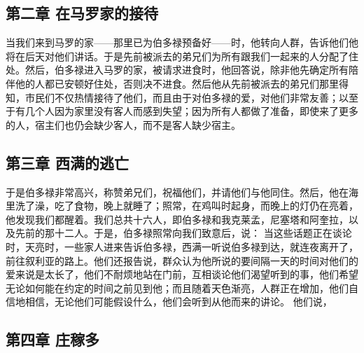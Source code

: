 
\subsection{第二章 在马罗家的接待}

当我们来到马罗的家——那里已为伯多禄预备好——时，他转向人群，告诉他们他将在后天对他们讲话。于是先前被派去的弟兄们为所有跟我们一起来的人分配了住处。然后，伯多禄进入马罗的家，被请求进食时，他回答说，除非他先确定所有陪伴他的人都已安顿好住处，否则决不进食。然后他从先前被派去的弟兄们那里得知，市民们不仅热情接待了他们，而且由于对伯多禄的爱，对他们非常友善；以至于有几个人因为家里没有客人而感到失望；因为所有人都做了准备，即使来了更多的人，宿主们也仍会缺少客人，而不是客人缺少宿主。\par


\subsection{第三章 西满的逃亡}

于是伯多禄非常高兴，称赞弟兄们，祝福他们，并请他们与他同住。然后，他在海里洗了澡，吃了食物，晚上就睡了；照常，在鸡叫时起身，而晚上的灯仍在亮着，他发现我们都醒着。我们总共十六人，即伯多禄和我克莱孟，尼塞塔和阿奎拉，以及先前的那十二人。于是，伯多禄照常向我们致意后，说： 当这些话题正在谈论时，天亮时，一些家人进来告诉伯多禄，西满一听说伯多禄到达，就连夜离开了，前往叙利亚的路上。他们还报告说，群众认为他所说的要间隔一天的时间对他们的爱来说是太长了，他们不耐烦地站在门前，互相谈论他们渴望听到的事，他们希望无论如何能在约定的时间之前见到他；而且随着天色渐亮，人群正在增加，他们自信地相信，无论他们可能假设什么，他们会听到从他而来的讲论。 他们说，\par


\subsection{第四章 庄稼多}

